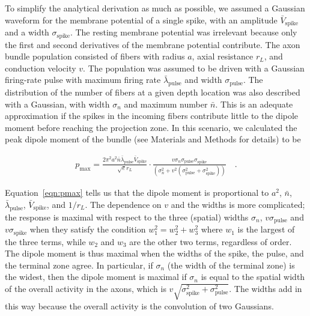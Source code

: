 \documentclass[]{elife}
\begin{document}
To simplify the analytical derivation as much as possible, we assumed a
Gaussian waveform for the membrane potential of a single spike, with an
amplitude \(\bar{V}_{\text{spike}}\) and a width
\(\sigma_{\text{spike}}\). The resting membrane potential was irrelevant
because only the first and second derivatives of the membrane potential
contribute. The axon bundle population consisted of fibers with radius
\(a\), axial resistance \(r_L\), and conduction velocity \(v\). The
population was assumed to be driven with a Gaussian firing-rate pulse
with maximum firing rate \(\bar{\lambda}_{\text{pulse}}\) and width
\(\sigma_{\text{pulse}}\). The distribution of the number of fibers at a
given depth location was also described with a Gaussian, with width
\(\sigma_n\) and maximum number \(\bar{n}\). This is an adequate
approximation if the spikes in the incoming fibers contribute little to
the dipole moment before reaching the projection zone. In this scenario,
we calculated the peak dipole moment of the bundle (see Materials and
Methods for details) to be

\begin{align}
p_\text{max} = \frac{2  \pi^2  a^2 \bar{n} \bar{\lambda}_{\text{pulse}} \bar{V}_{\text{spike}}}{\sqrt{e} r_L } \cdot
\frac{v \sigma_n \sigma_{\text{pulse}} \sigma_{\text{spike}}}
{\left(\sigma_n^2+v^2 \left(\sigma_{\text{pulse}}^2+\sigma_{\text{spike}}^2\right)\right)} \label{eqn:pmax}
\quad .
\end{align}

Equation~\ref{eqn:pmax} tells us that the dipole moment is proportional
to \(a^2\), \(\bar{n}\), \(\bar{\lambda}_{\text{pulse}}\),
\(\bar{V}_{\text{spike}}\), and \(1/r_L\). The dependence on \(v\) and
the widths is more complicated; the response is maximal with respect to
the three (spatial) widths \(\sigma_n\), \(v\sigma_{\text{pulse}}\) and
\(v\sigma_{\text{spike}}\) when they satisfy the condition
\(w_1^2=w_2^2+w_3^2\) where \(w_1\) is the largest of the three terms,
while \(w_2\) and \(w_3\) are the other two terms, regardless of order.
The dipole moment is thus maximal when the widths of the spike, the
pulse, and the terminal zone agree. In particular, if \(\sigma_n\) (the
width of the terminal zone) is the widest, then the dipole moment is
maximal if \(\sigma_n\) is equal to the spatial width of the overall
activity in the axons, which is
\(v\sqrt{\sigma_{\text{spike}}^2+\sigma_{\text{pulse}}^2}\). The widths
add in this way because the overall activity is the convolution of two
Gaussians.
\end{document}

